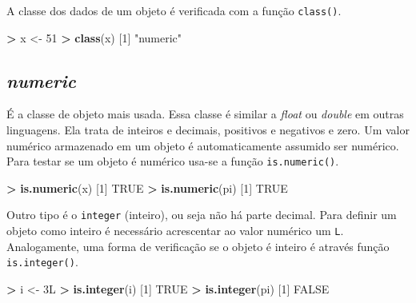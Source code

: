 \documentclass[]{book}
\newenvironment{Shaded}{\begin{snugshade}}{\end{snugshade}}
\newcommand{\KeywordTok}[1]{\textcolor[rgb]{0.13,0.29,0.53}{\textbf{#1}}}
\newcommand{\DecValTok}[1]{\textcolor[rgb]{0.00,0.00,0.81}{#1}}
\newcommand{\StringTok}[1]{\textcolor[rgb]{0.31,0.60,0.02}{#1}}
\newcommand{\OtherTok}[1]{\textcolor[rgb]{0.56,0.35,0.01}{#1}}
\newcommand{\OperatorTok}[1]{\textcolor[rgb]{0.81,0.36,0.00}{\textbf{#1}}}
\newcommand{\NormalTok}[1]{#1}
\begin{document}
A classe dos dados de um objeto é verificada com a função
\texttt{class()}.

\begin{Shaded}
\begin{Highlighting}[]
\OperatorTok{>}\StringTok{ }\NormalTok{x <-}\StringTok{ }\DecValTok{51}
\OperatorTok{>}\StringTok{ }\KeywordTok{class}\NormalTok{(x)}
\NormalTok{[}\DecValTok{1}\NormalTok{] }\StringTok{"numeric"}
\end{Highlighting}
\end{Shaded}

\subsection{\texorpdfstring{\emph{numeric}}{numeric}}\label{numeric}

É a classe de objeto mais usada. Essa classe é similar a \emph{float} ou
\emph{double} em outras linguagens. Ela trata de inteiros e decimais,
positivos e negativos e zero. Um valor numérico armazenado em um objeto
é automaticamente assumido ser numérico. Para testar se um objeto é
numérico usa-se a função \texttt{is.numeric()}.

\begin{Shaded}
\begin{Highlighting}[]
\OperatorTok{>}\StringTok{ }\KeywordTok{is.numeric}\NormalTok{(x)}
\NormalTok{[}\DecValTok{1}\NormalTok{] }\OtherTok{TRUE}
\OperatorTok{>}\StringTok{ }\KeywordTok{is.numeric}\NormalTok{(pi)}
\NormalTok{[}\DecValTok{1}\NormalTok{] }\OtherTok{TRUE}
\end{Highlighting}
\end{Shaded}

Outro tipo é o \texttt{integer} (inteiro), ou seja não há parte decimal.
Para definir um objeto como inteiro é necessário acrescentar ao valor
numérico um \texttt{L}. Analogamente, uma forma de verificação se o
objeto é inteiro é através função \texttt{is.integer()}.

\begin{Shaded}
\begin{Highlighting}[]
\OperatorTok{>}\StringTok{ }\NormalTok{i <-}\StringTok{ }\NormalTok{3L}
\OperatorTok{>}\StringTok{ }\KeywordTok{is.integer}\NormalTok{(i)}
\NormalTok{[}\DecValTok{1}\NormalTok{] }\OtherTok{TRUE}
\OperatorTok{>}\StringTok{ }\KeywordTok{is.integer}\NormalTok{(pi)}
\NormalTok{[}\DecValTok{1}\NormalTok{] }\OtherTok{FALSE}
\end{Highlighting}
\end{Shaded}
\end{document}
